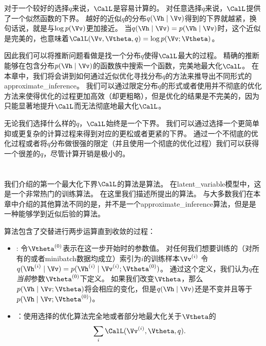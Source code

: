 对于一个较好的选择$q$来说，$\CalL$是容易计算的。
对任意选择$q$来说，$\CalL$提供了一个似然函数的下界。
越好的近似$q$的分布$q(\Vh\mid\Vv)$得到的下界就越紧，换句话说，就是与$\log p(\Vv)$更加接近。
当$q(\Vh\mid\Vv) = p(\Vh\mid\Vv)$时，这个近似是完美的，也意味着$\CalL(\Vv,{\Vtheta},q) = \log {p(\Vv;{\Vtheta})} $。


因此我们可以将推断问题看做是找一个分布$q$使得$\CalL$最大的过程。
精确的推断能够在包含分布$p(\Vh\mid\Vv)$的函数族中搜索一个函数，完美地最大化$\CalL$。
在本章中，我们将会讲到如何通过近似优化寻找分布$q$的方法来推导出不同形式的\gls{approximate_inference}。
我们可以通过限定分布$q$的形式或者使用并不彻底的优化方法来使得优化的过程更加高效（却更粗略），但是优化的结果是不完美的，因为只能显著地提升$\CalL$而无法彻底地最大化$\CalL$。


无论我们选择什么样的$q$，$\CalL$始终是一个下界。
我们可以通过选择一个更简单抑或更复杂的计算过程来得到对应的更松或者更紧的下界。
通过一个不彻底的优化过程或者将$q$分布做很强的限定（并且使用一个彻底的优化过程）我们可以获得一个很差的$q$，尽管计算开销是极小的。


\section{}
\label{sec:expectation_maximization}

我们介绍的第一个最大化下界$\CalL$的算法是算法。
在\gls{latent_variable}模型中，这是一个非常热门的训练算法。
在这里我们描述\citet{emview}所提出的算法。
与大多数我们在本章中介绍的其他算法不同的是，并不是一个\gls{approximate_inference}算法，但是是一种能够学到近似后验的算法。


算法包含了交替进行两步运算直到收敛的过程：
\begin{itemize}
\item {}: 令${\Vtheta^{(0)}}$表示在这一步开始时的参数值。
对任何我们想要训练的（对所有的或者\gls{minibatch}数据均成立）索引为$i$的训练样本$\Vv^{(i)}$ 令$q(\Vh^{(i)}\mid \Vv) = p(\Vh^{(i)}\mid\Vv^{(i)};\Vtheta^{(0)})$。
通过这个定义，我们认为$q$在\emph{当前}参数$\Vtheta^{(0)}$下定义。
如果我们改变$\Vtheta$，那么$p(\Vh\mid\Vv;\Vtheta)$将会相应的变化，但是$q(\Vh\mid\Vv)$还是不变并且等于$p(\Vh\mid\Vv;\Vtheta^{(0)})$。
\item {}：使用选择的优化算法完全地或者部分地最大化关于$\Vtheta$的
\begin{align}
\sum_i \CalL(\Vv^{(i)},\Vtheta,q).
\end{align}
\end{itemize}


